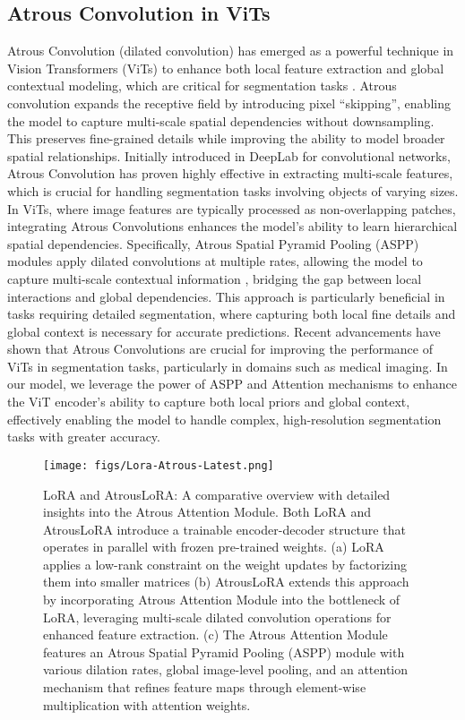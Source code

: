 \subsection{Atrous Convolution in ViTs}
Atrous Convolution (dilated convolution) has emerged as a powerful technique in Vision Transformers (ViTs) to enhance both local feature extraction and global contextual modeling, which are critical for segmentation tasks \cite{Liu2022,TONG2024213,Lam2021}. Atrous convolution expands the receptive field by introducing pixel “skipping”, enabling the model to capture multi-scale spatial dependencies without downsampling. This preserves fine-grained details while improving the ability to model broader spatial relationships. Initially introduced in DeepLab \cite{r20} for convolutional networks, Atrous Convolution has proven highly effective in extracting multi-scale features, which is crucial for handling segmentation tasks involving objects of varying sizes. In ViTs, where image features are typically processed as non-overlapping patches, integrating Atrous Convolutions enhances the model’s ability to learn hierarchical spatial dependencies. Specifically, Atrous Spatial Pyramid Pooling (ASPP) modules apply dilated convolutions at multiple rates, allowing the model to capture multi-scale contextual information \cite{Yu2015}, bridging the gap between local interactions and global dependencies. This approach is particularly beneficial in tasks requiring detailed segmentation, where capturing both local fine details and global context is necessary for accurate predictions. Recent advancements have shown that Atrous Convolutions are crucial for improving the performance of ViTs in segmentation tasks, particularly in domains such as medical imaging. In our model, we leverage the power of ASPP and Attention mechanisms to enhance the ViT encoder’s ability to capture both local priors and global context, effectively enabling the model to handle complex, high-resolution segmentation tasks with greater accuracy.

\begin{figure*}[ht]
	\centering
	\texttt{[image: figs/Lora-Atrous-Latest.png]}
	\caption{LoRA and AtrousLoRA: A comparative overview with detailed insights into the Atrous Attention Module. Both LoRA and AtrousLoRA introduce a trainable encoder-decoder structure that operates in parallel with frozen pre-trained weights. (a) LoRA applies a low-rank constraint on the weight updates by factorizing them into smaller matrices (b) AtrousLoRA extends this approach by incorporating Atrous Attention Module into the bottleneck of LoRA, leveraging multi-scale dilated convolution operations for enhanced feature extraction. (c) The Atrous Attention Module features an Atrous Spatial Pyramid Pooling (ASPP) module with various dilation rates, global image-level pooling, and an attention mechanism that refines feature maps through element-wise multiplication with attention weights.}
	\label{fig2}
\end{figure*}